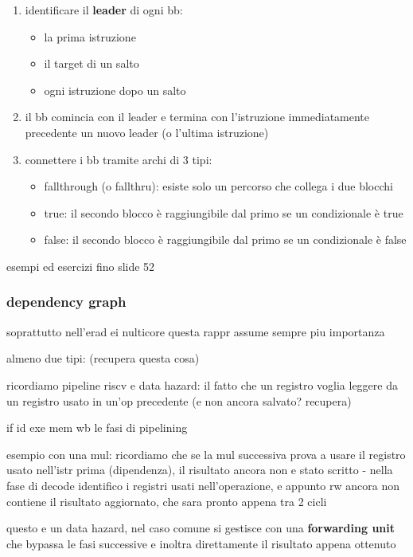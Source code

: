 \begin{enumerate}
  \item identificare il \textbf{leader} di ogni bb:
    \begin{itemize}
      \item la prima istruzione
      \item il target di un salto
      \item ogni istruzione dopo un salto
    \end{itemize}
  \item il bb comincia con il leader e termina con l'istruzione immediatamente precedente un nuovo leader (o l'ultima istruzione)
  \item connettere i bb tramite archi di 3 tipi:
    \begin{itemize}
      \item fallthrough (o fallthru): esiste solo un percorso che collega i due blocchi
      \item true: il secondo blocco \`e raggiungibile dal primo se un condizionale \`e true
      \item false: il secondo blocco \`e raggiungibile dal primo se un condizionale \`e false
    \end{itemize}
    
\end{enumerate}

esempi ed esercizi fino slide 52

\subsubsection{dependency graph}

soprattutto nell'erad ei nulticore questa rappr assume sempre piu importanza

almeno due tipi: (recupera questa cosa)

ricordiamo pipeline riscv e data hazard: il fatto che un registro voglia leggere da un registro usato in un'op precedente (e non ancora salvato? recupera)

if id exe mem wb le fasi di pipelining

esempio con una mul: ricordiamo che se la mul successiva prova a usare il registro usato nell'istr prima (dipendenza), il risultato ancora non e stato scritto - nella fase di decode identifico i registri usati nell'operazione, e appunto rw ancora non contiene il risultato aggiornato, che sara pronto appena tra 2 cicli

questo e un data hazard, nel caso comune si gestisce con una \textbf{forwarding unit} che bypassa le fasi successive e inoltra direttamente il risultato appena ottenuto

